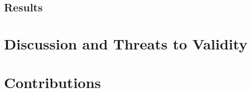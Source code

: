 \documentclass[conference]{IEEEtran}
\begin{document}
\subsection{Results}
\label{sec:results}

\section{Discussion and Threats to Validity}
\label{sec:dicussion}

\section{Contributions}
\label{sec:contributions}



\end{document}
